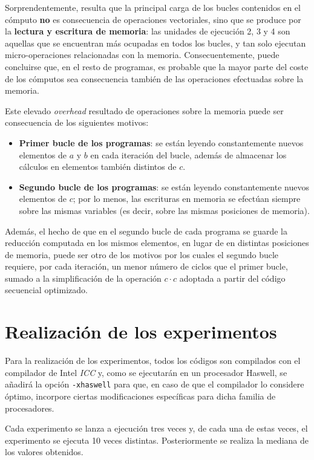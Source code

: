 \documentclass[conference]{IEEEtran}
\begin{document}
Sorprendentemente, resulta que la principal carga de los bucles contenidos en el cómputo \textbf{no} es consecuencia de operaciones vectoriales, sino que se produce por la \textbf{lectura y escritura de memoria}: las unidades de ejecución 2, 3 y 4 son aquellas que se encuentran más ocupadas en todos los bucles, y tan solo ejecutan micro-operaciones relacionadas con la memoria. Consecuentemente, puede concluirse que, en el resto de programas, es probable que la mayor parte del coste de los cómputos sea consecuencia también de las operaciones efectuadas sobre la memoria.

Este elevado \textit{overhead} resultado de operaciones sobre la memoria puede ser consecuencia de los siguientes motivos:

\begin{itemize}
    \item \textbf{Primer bucle de los programas}: se están leyendo constantemente nuevos elementos de $a$ y $b$ en cada iteración del bucle, además de almacenar los cálculos en elementos también distintos de $c$.
    \item \textbf{Segundo bucle de los programas}: se están leyendo constantemente nuevos elementos de $c$; por lo menos, las escrituras en memoria se efectúan siempre sobre las mismas variables (es decir, sobre las mismas posiciones de memoria).
\end{itemize}

Además, el hecho de que en el segundo bucle de cada programa se guarde la reducción computada en los mismos elementos, en lugar de en distintas posiciones de memoria, puede ser otro  de los motivos por los cuales el segundo bucle requiere, por cada iteración, un menor número de ciclos que el primer bucle, sumado a la simplificación de la operación $c \cdot c$ adoptada a partir del código secuencial optimizado.

\section{Realización de los experimentos} \label{experimentos}

Para la realización de los experimentos, todos los códigos son compilados con el compilador de Intel \textit{ICC} y, como se ejecutarán en un procesador Haswell, se añadirá la opción \texttt{-xhaswell} para que, en caso de que el compilador lo considere óptimo, incorpore ciertas modificaciones específicas para dicha familia de procesadores.

Cada experimento se lanza a ejecución tres veces y, de cada una de estas veces, el experimento se ejecuta 10 veces distintas. Posteriormente se realiza la mediana de los valores obtenidos.
\end{document}
